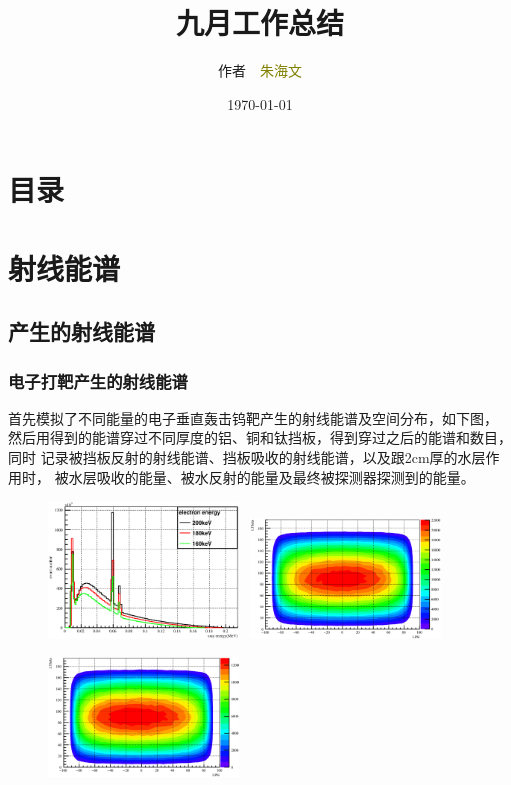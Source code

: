 \documentclass{beamer}
\newcommand{\liuhao}{\fontsize{7.875pt}{\baselineskip}\selectfont}
\begin{document}
\begin{CJK*}{UTF8}{gkai}
  \title{九月工作总结}
  \author[\textcolor{white}{作者 朱海文}]{作者~~\textcolor{olive}{朱海文}}
  \institute{\textcolor{violet}{摩科特医疗器械有限公司}}
  \date{\today}
  \frame{\titlepage}
  \section*{目录}
  \section{射线能谱}
  \subsection{产生的射线能谱}
  \begin{frame}\frametitle{电子打靶产生的射线能谱}
    \vskip -0.3cm
    \begin{alertblock}{}\liuhao
      首先模拟了不同能量的电子垂直轰击钨靶产生的射线能谱及空间分布，如下图，
      然后用得到的能谱穿过不同厚度的铝、铜和钛挡板，得到穿过之后的能谱和数目，同时
      记录被挡板反射的射线能谱、挡板吸收的射线能谱，以及跟2cm厚的水层作用时，
      被水层吸收的能量、被水反射的能量及最终被探测器探测到的能量。
    \end{alertblock}
    \vskip -0.3cm
    \begin{figure}[ht]
      \includegraphics[width=0.45\textwidth]{xray.eps}~
      \includegraphics[width=0.45\textwidth]{xraydir.eps}

      \includegraphics[width=0.45\textwidth]{Dir20dir.eps}
    \end{figure}
  \end{frame}

\end{CJK*}
\end{document}
